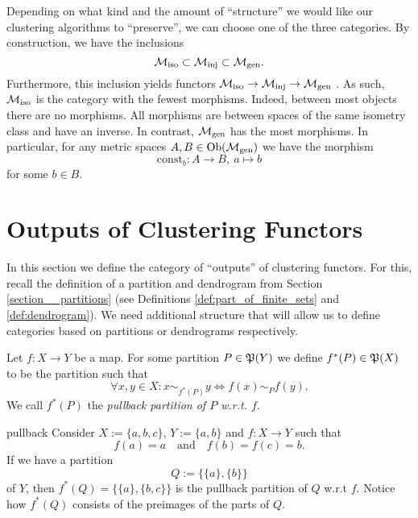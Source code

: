 Depending on what kind and the amount of ``structure'' we would like our clustering algorithms to ``preserve'', we can choose one of the three categories.
By construction, we have the inclusions
\begin{equation}
    \label{eq:inclusions_of_finite_metric_space_categories}
    \iso \subset \inj \subset \gen.
\end{equation}
Furthermore, this inclusion yields functors $\iso \to \inj \to \gen$ \cite[Def.~1.2.18]{Leinster2014-dc}.
As such, $\iso$ is the category with the fewest morphisms. Indeed, between most objects there are no morphisms.
All morphisms are between spaces of the same isometry class and have an inverse.
In contrast, $\gen$ has the most morphisms. In particular, for any metric spaces $A,B \in \ob(\gen)$ we have the morphism
$$
\mathrm{const}_b\colon A \to B, \ a \mapsto b
$$
for some $b \in B$.

\section{Outputs of Clustering Functors}
\label{section__outputs}

In this section we define the category of ``outputs'' of clustering functors. For this, recall the definition of a partition and dendrogram from Section \ref{section__partitions} (see Definitions \ref{def:part_of_finite_sets} and \ref{def:dendrogram}).
We need additional structure that will allow us to define categories based on partitions or dendrograms respectively.

\begin{definition}{}{}
Let $f\colon X \to Y$ be a map. For some partition $P \in \P(Y)$ we define $f^*(P) \in \P(X)$ to be the partition such that
\begin{equation*}
    \forall x,y \in X: x \sim_{f^*(P)} y \iff f(x) \sim_P f(y).
\end{equation*}
We call $f^*(P)$ the \emph{pullback partition of $P$ w.r.t. $f$}.
\end{definition}

\begin{example}{}{pullback}
Consider $X := \{a,b,c\}$, $Y := \{a,b\}$ and $f\colon X \to Y$ such that
$$
f(a) = a \quad \text{and} \quad f(b) = f(c) = b.
$$
If we have a partition
$$
Q := \{\{a\}, \{b\}\}
$$
of $Y$, then $f^*(Q) = \{\{a\}, \{b,c\}\}$ is the pullback partition of $Q$ w.r.t $f$. Notice how $f^*(Q)$ consists of the preimages of the parts of $Q$. 
\end{example}

